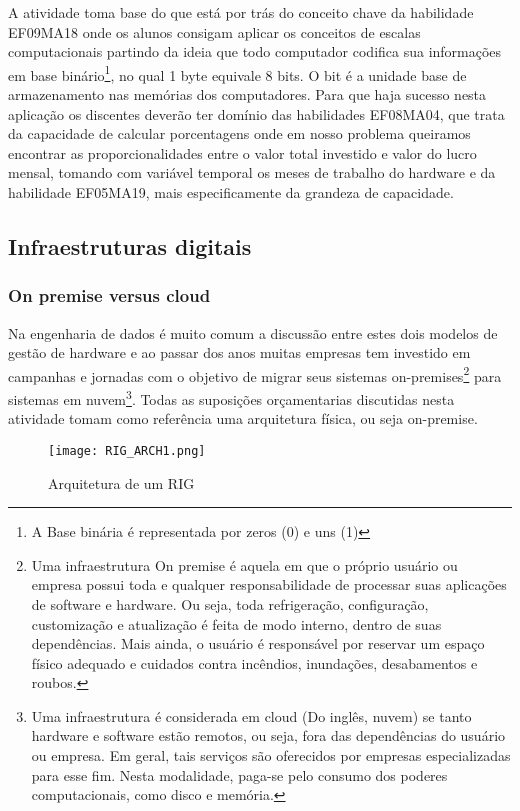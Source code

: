 A atividade toma base do que está por trás do conceito chave da habilidade EF09MA18 onde os alunos consigam aplicar os conceitos de escalas computacionais partindo da ideia que todo computador codifica sua informações em base binário\footnote{A Base binária é representada por zeros (0) e uns (1)}, no qual 1 byte equivale 8 bits. O bit é a unidade base de armazenamento nas memórias dos computadores. Para que haja sucesso nesta aplicação os discentes  deverão ter domínio das habilidades EF08MA04, que trata da capacidade de calcular porcentagens onde em nosso problema queiramos encontrar as proporcionalidades entre o valor total investido e valor do lucro mensal, tomando com variável temporal os meses de trabalho do hardware e da habilidade EF05MA19, mais especificamente da grandeza de capacidade.

\subsection{Infraestruturas digitais}   
\subsubsection{On premise versus cloud} 
Na engenharia de dados é muito comum a discussão entre estes dois modelos de gestão de hardware e ao passar dos anos muitas empresas tem investido em campanhas e jornadas com o objetivo de migrar seus sistemas on-premises\footnote{Uma infraestrutura On premise é aquela em que o próprio usuário ou empresa possui toda e qualquer responsabilidade de processar suas aplicações de software e hardware. Ou seja, toda refrigeração, configuração, customização e atualização é feita de modo interno, dentro de suas dependências. Mais ainda, o usuário é responsável por reservar um espaço físico adequado e cuidados contra incêndios, inundações, desabamentos e roubos.} para sistemas em nuvem\footnote{Uma infraestrutura é considerada em cloud (Do inglês, nuvem) se tanto hardware e software estão remotos, ou seja, fora das dependências do usuário ou empresa. Em geral, tais serviços são oferecidos por empresas especializadas para esse fim. Nesta modalidade, paga-se pelo consumo dos poderes computacionais, como disco e memória.}. Todas as suposições orçamentarias discutidas nesta atividade tomam como referência uma arquitetura física, ou seja on-premise. 

\begin{figure}[H] 
	\centering
	\caption{Arquitetura de um RIG}
	\texttt{[image: RIG\_ARCH1.png]}\\
	
\end{figure}   

